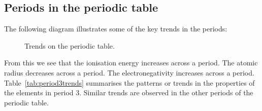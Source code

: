             \subsection*{Periods in the periodic table}
            \nopagebreak
            \label{m38760*id261855} The following diagram illustrates some of the key trends in the periods: \\
\begin{figure}[H]

\begin{center}
\end{center}

\caption{Trends on the periodic table.}
\label{fig:atom:periodic2}
 \end{figure} 
From this we see that the ionisation energy increases across a period. The atomic radius decreases across a period. The electronegativity increases across a period. Table~\ref{tab:period3trends} summarises the patterns or trends in the properties of the elements in period 3. Similar trends are observed in the other periods of the periodic table. \\
